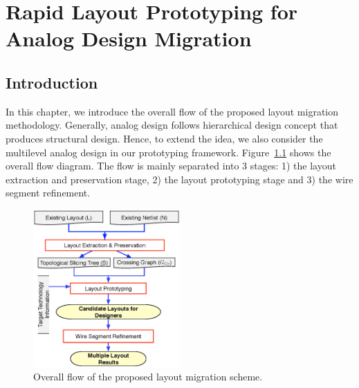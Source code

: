 
\chapter{Rapid Layout Prototyping for Analog Design Migration}\label{chap:RLPADM}
  
  \section{Introduction}\label{sec:RLPADMIntro}

    In this chapter, we introduce the overall flow of the proposed layout migration methodology. Generally, analog design follows hierarchical design concept that produces structural design. 
    Hence, to extend the idea, we also consider the multilevel analog design in our prototyping framework. Figure~\ref{fig:Flow} shows the overall flow diagram. The flow is mainly separated into 3 stages: 1) the layout extraction and preservation stage, 2) the layout prototyping stage and 3) the wire segment refinement. 
    
    
    \begin{figure}[ht]
      \centering
      \includegraphics[width=0.5\textwidth]{Fig/Chapter4/Flow.eps}
      \caption{Overall flow of the proposed layout migration scheme.} 
      \label{fig:Flow}
    \end{figure}

